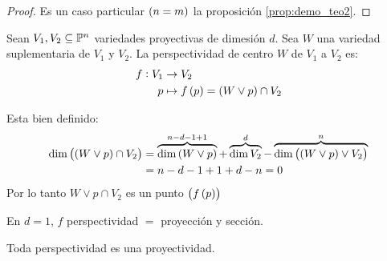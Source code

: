 \begin{proof}
    Es un caso particular $\left( n = m \right)$ la proposición \ref{prop:demo_teo2}.
\end{proof}
\begin{defi}
    Sean $V_1, V_2 \subseteq \mathbb{P}^n$ variedades proyectivas de dimesión $d$. Sea $W$ una variedad suplementaria de $V_1$ y $V_2$. La perspectividad de centro $W$ de $V_1$ a $V_2$ es:
    \begin{align*}
        f : V_1 &\to V_2 \\
        p &\mapsto f \left( p \right) = \left( W \vee p \right) \cap V_2
    \end{align*}
\end{defi}
\begin{obs}
    Esta bien definido:
    \begin{align*}
        \dim \left( \left( W \vee p \right) \cap V_2 \right) &= \overbrace{\dim \left( W \vee p \right)}^{ n -d -1 + 1} + \overbrace{\dim V_2}^{d} - \overbrace{\dim \left( \left( W \vee p \right) \vee V_2 \right)}^n \\
        &= n -d -1 + 1 + d - n = 0
    \end{align*}
    Por lo tanto $W \vee p \cap V_2$ es un punto $\left( f \left( p \right) \right)$
\end{obs}
\begin{obs}
    En $d = 1$, $f$ perspectividad $=$ proyección y sección.
\end{obs}
\begin{col}
    Toda perspectividad es una proyectividad.
\end{col}
